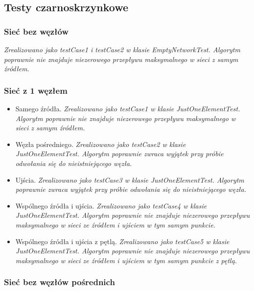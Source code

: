 \subsection{Testy czarno\dywiz skrzynkowe}

\subsubsection{Sieć bez węzłów}
\emph{Zrealizowano jako testCase1 i testCase2 w klasie EmptyNetworkTest.
Algorytm poprawnie nie znajduje niezerowego przepływu maksymalnego w sieci
z samym źródłem.}

\subsubsection{Sieć z 1 węzłem}

\begin{itemize}[nosep]
    \item Samego źródła.
    \emph{Zrealizowano jako testCase1 w klasie JustOneElementTest.
    Algorytm poprawnie nie znajduje niezerowego przepływu maksymalnego w sieci
    z samym źródłem.}

    \item Węzła pośredniego.
    \emph{Zrealizowano jako testCase2 w klasie JustOneElementTest.
    Algorytm poprawnie zwraca wyjątek przy próbie odwołania się
    do nieistniejącego węzła.}

    \item Ujścia.
    \emph{Zrealizowano jako testCase3 w klasie JustOneElementTest.
    Algorytm poprawnie zwraca wyjątek przy próbie odwołania się
    do nieistniejącego węzła.}

    \item Wspólnego źródła i ujścia.
    \emph{Zrealizowano jako testCase4 w klasie JustOneElementTest.
    Algorytm poprawnie nie znajduje niezerowego przepływu maksymalnego w sieci
    ze źródłem i ujściem w tym samym punkcie.}

    \item Wspólnego źródła i ujścia z pętlą.
    \emph{Zrealizowano jako testCase5 w klasie JustOneElementTest.
    Algorytm poprawnie nie znajduje niezerowego przepływu maksymalnego w sieci
    ze źródłem i ujściem w tym samym punkcie z pętlą.}
\end{itemize}


\subsubsection{Sieć bez węzłów pośrednich}

